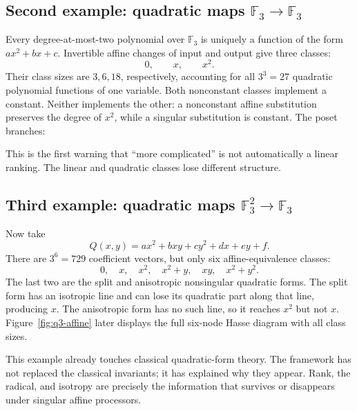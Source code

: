 \documentclass[11pt]{article}
\theoremstyle{definition}
\theoremstyle{plain}
\theoremstyle{remark}
\newcommand{\F}{\mathbb F}
\begin{document}
\subsection*{Second example: quadratic maps
\texorpdfstring{\(\F_3\to\F_3\)}{F3 to F3}}

Every degree-at-most-two polynomial over \(\F_3\) is uniquely a function of
the form \(ax^2+bx+c\).  Invertible affine changes of input and output give
three classes:
\[
  0,\qquad x,\qquad x^2.
\]
Their class sizes are \(3,6,18\), respectively, accounting for all
\(3^3=27\) quadratic polynomial functions of one variable.
Both nonconstant classes implement a constant.  Neither implements the other:
a nonconstant affine substitution preserves the degree of \(x^2\), while a
singular substitution is constant.  The poset branches:
\begin{center}
\end{center}
This is the first warning that ``more complicated'' is not automatically a
linear ranking.  The linear and quadratic classes lose different structure.

\subsection*{Third example: quadratic maps
\texorpdfstring{\(\F_3^2\to\F_3\)}{F3 squared to F3}}

Now take
\[
  Q(x,y)=ax^2+bxy+cy^2+dx+ey+f.
\]
There are \(3^6=729\) coefficient vectors, but only six affine-equivalence
classes:
\[
  0,\quad x,\quad x^2,\quad x^2+y,\quad xy,\quad x^2+y^2.
\]
The last two are the split and anisotropic nonsingular quadratic forms.  The
split form has an isotropic line and can lose its quadratic part along that
line, producing \(x\).  The anisotropic form has no such line, so it reaches
\(x^2\) but not \(x\).  Figure~\ref{fig:q3-affine} later displays the full
six-node Hasse diagram with all class sizes.

This example already touches classical quadratic-form theory.  The framework
has not replaced the classical invariants; it has explained why they appear.
Rank, the radical, and isotropy are precisely the information that survives or
disappears under singular affine processors.
\end{document}
